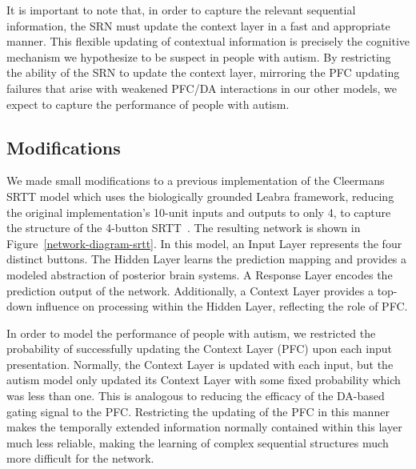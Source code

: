 \documentclass[man]{apa}
\begin{document}
It is important to note that, in order to capture the relevant sequential information, the SRN must update the context layer in a fast and appropriate manner.  This flexible updating of contextual information is precisely the cognitive mechanism we hypothesize to be suspect in people with autism.  By restricting the ability of the SRN to update the context layer, mirroring the PFC updating failures that arise with weakened PFC/DA interactions in our other models, we expect to capture the performance of people with autism.

\subsection{Modifications}
We made small modifications to a previous implementation of the Cleermans SRTT model which uses the biologically grounded Leabra framework, reducing the original implementation's 10-unit inputs and outputs to only 4, to capture the structure of the 4-button SRTT~\cite{OReillyRC:2000:Computational}.  The resulting network is shown in Figure~\ref{network-diagram-srtt}.  In this model, an Input Layer represents the four distinct buttons.  The Hidden Layer learns the prediction mapping and provides a modeled abstraction of posterior brain systems.  A Response Layer encodes the prediction output of the network.  Additionally, a Context Layer provides a top-down influence on processing within the Hidden Layer, reflecting the role of PFC.

In order to model the performance of people with autism, we restricted the probability of successfully updating the Context Layer (PFC) upon each input presentation.  Normally, the Context Layer is updated with each input, but the autism model only updated its Context Layer with some fixed probability which was less than one.  This is analogous to reducing the efficacy of the DA-based gating signal to the PFC.  Restricting the updating of the PFC in this manner makes the temporally extended information normally contained within this layer much less reliable, making the learning of complex sequential structures much more difficult for the network.
\end{document}
